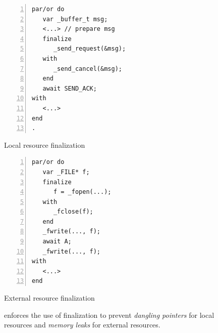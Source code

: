 \begin{figure}
\begin{minipage}[t]{0.48\linewidth}
\begin{lstlisting}[numbers=left,xleftmargin=3.5em,mathescape=true]
par/or do
   var _buffer_t msg;
   <...> // prepare msg
   finalize
      _send_request(&msg);
   with
      _send_cancel(&msg);
   end
   await SEND_ACK;
with
   <...>
end
.
\end{lstlisting}
\centering\small{\ax Local resource finalization}
\end{minipage}
%
\begin{minipage}[t]{0.48\linewidth}
\begin{lstlisting}[numbers=left,xleftmargin=3.5em]
par/or do
   var _FILE* f;
   finalize
      f = _fopen(...);
   with
      _fclose(f);
   end
   _fwrite(..., f);
   await A;
   _fwrite(..., f);
with
   <...>
end
\end{lstlisting}
\centering\small{\bx External resource finalization}
\end{minipage}
\caption{
\CEU enforces the use of finalization to prevent \emph{dangling pointers} for
local resources and \emph{memory leaks} for external resources.
\label{lst.fin.ceu}
}
\end{figure}
